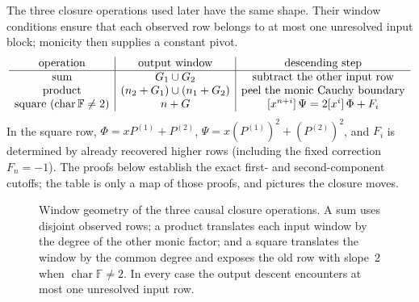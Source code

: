 The three closure operations used later have the same shape.  Their window
conditions ensure that each observed row belongs to at most one unresolved
input block; monicity then supplies a constant pivot.
\[
\begin{array}{c|c|c}
  \text{operation}&\text{output window}&\text{descending step}\\ \hline
  \text{sum}&G_1\cup G_2&\text{subtract the other input row}\\
  \text{product}&(n_2+G_1)\cup(n_1+G_2)
    &\text{peel the monic Cauchy boundary}\\
  \text{square }(\operatorname{char}\mathbb F\ne2)&n+G
    &[x^{n+i}]\,\Psi=2[x^{i}]\,\Phi+F_i
\end{array}
\]
In the square row, $\Phi=xP^{(1)}+P^{(2)}$,
$\Psi=x(P^{(1)})^2+(P^{(2)})^2$, and $F_i$ is determined by already
recovered higher rows (including the fixed correction $F_n=-1$).
The proofs below establish the exact first- and second-component cutoffs; the
table is only a map of those proofs, and  pictures
the closure moves.

\begin{figure}[H]
  \centering
  \resizebox{\textwidth}{!}{}
  \caption{Window geometry of the three causal closure operations.  A sum
  uses disjoint observed rows; a product translates each input window by the
  degree of the other monic factor; and a square translates the window by
  the common degree and exposes the old row with slope~$2$ when
  $\operatorname{char}\mathbb F\ne2$.  In every case
  the output descent encounters at most one unresolved input row.}
  \label{fig:causal-closures}
\end{figure}

